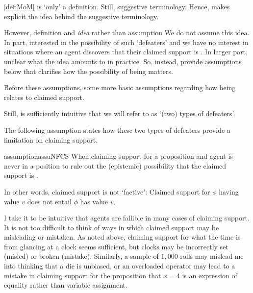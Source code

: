\begin{note}
  \autoref{def:MoM} is `only' a definition.
  Still, suggestive terminology.
  Hence, \twodefeaters{} makes explicit the idea behind the suggestive terminology.

  However, definition and \emph{idea} rather than assumption
  We do not assume this idea.
  In part, interested in the possibility of such `defeaters' and we have no interest in situations where an agent discovers that their claimed support is \mom{}.
  In larger part, unclear what the idea amounts to in practice.
  So, instead, provide {\color{red} assumptions} below that clarifies how the possibility of being \mom{} matters.

  Before these {\color{red} assumptions}, {\color{red} some more basic assumptions} regarding how being \mom{} relates to claimed support.

  Still, \twodefeaters{} is sufficiently intuitive that we will refer to \mom{} as `(two) types of defeaters'.
\end{note}

\begin{note}
  The following assumption states how these two types of defeaters provide a limitation on claiming support.

  \begin{restatable}[\nfcs{--} -- \nfcs{}]{assumption}{assuNFCS}\label{assu:supp:nfactive}
    When claiming support for a proposition and agent is never in a position to rule out the (epistemic) possibility that the claimed support is \nmom{}.
  \end{restatable}

  In other words, claimed support is not `factive': Claimed support for \(\phi\) having value \(v\) does not entail \(\phi\) has value \(v\).
\end{note}

\begin{note}
  I take it to be intuitive that agents are fallible in many cases of claiming support.
  It is not too difficult to think of ways in which claimed support may be misleading or mistaken.
  As noted above, claiming support for what the time is from glancing at a clock seems sufficient, but clocks may be incorrectly set (misled) or broken (mistake).
  Similarly, a sample of \(1,000\) rolls may mislead me into thinking that a die is unbiased, or an overloaded operator may lead to a mistake in claiming support for the proposition that \(x = 4\) is an expression of equality rather than variable assignment.
\end{note}

